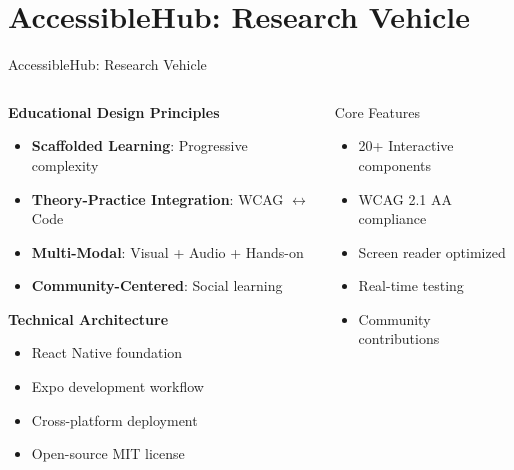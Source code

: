 \documentclass[10pt,aspectratio=169]{beamer}
\begin{document}
\section{AccessibleHub: Research Vehicle}

\begin{frame}{AccessibleHub: Research Vehicle}
    \begin{columns}[c]
        \begin{column}{0.55\textwidth}
            \textbf{Educational Design Principles}
            \begin{itemize}
                \item \textbf{Scaffolded Learning}: Progressive complexity
                \item \textbf{Theory-Practice Integration}: WCAG $\leftrightarrow$ Code
                \item \textbf{Multi-Modal}: Visual + Audio + Hands-on
                \item \textbf{Community-Centered}: Social learning
            \end{itemize}
            
            \vspace{0.4cm}
            
            \textbf{Technical Architecture}
            \begin{itemize}
                \item React Native foundation
                \item Expo development workflow
                \item Cross-platform deployment
                \item Open-source MIT license
            \end{itemize}
        \end{column}
        \begin{column}{0.4\textwidth}
            \begin{block}{Core Features}
                \begin{itemize}
                    \item 20+ Interactive components
                    \item WCAG 2.1 AA compliance
                    \item Screen reader optimized
                    \item Real-time testing
                    \item Community contributions
                \end{itemize}
            \end{block}
            

\end{column}
\end{columns}
\end{frame}
\end{document}
